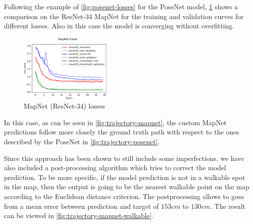 Following the example of \cref{fig:posenet-losses} for the PoseNet model, \cref{fig:mapnet-losses} shows a comparison on the ResNet-34 MapNet for the training and validation curves for different losses. Also in this case the model is converging without overfitting.
\begin{figure}[htbp]
    \begin{center}
        \includegraphics[width=0.4\textwidth]{./imgs/mapnet_losses.png}
    \end{center}
    \caption{MapNet (ResNet-34) losses}
    \label{fig:mapnet-losses}
\end{figure}

In this case, as can be seen in \cref{fig:trajectory-mapnet}, the custom MapNet predictions follow more closely the ground truth path with respect to the ones described by the PoseNet in \cref{fig:trajectory-posenet}.

Since this approach has been shown to still include some imperfections, we have also included a post-processing algorithm which tries to correct the model prediction. To be more specific, if the model prediction is not in a walkable spot in the map, then the output is going to be the nearest walkable point on the map according to the Euclidean distance criterion. The postprocessing allows to goes from a mean error between prediction and target of $153 cm$ to $130 cm$. The result can be viewed in \cref{fig:trajectory-mapnet-walkable}.

